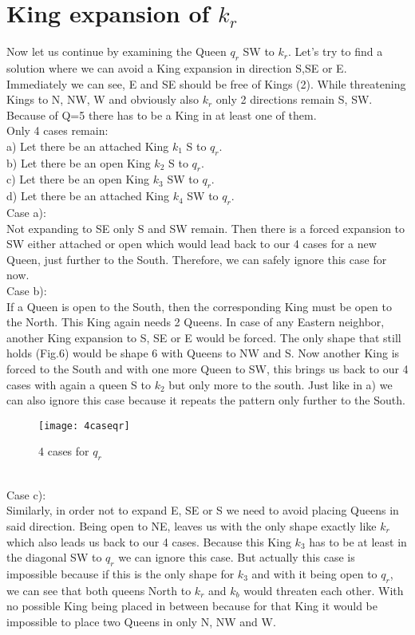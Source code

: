 \documentclass[a4paper,oneside]{scrarticle}
\begin{document}
	\section{King expansion of $k_r$}
	Now let us continue by examining the Queen $q_r$ SW to $k_r$. Let's try to find a solution where we can avoid a King expansion in direction S,SE or E. Immediately we can see, E and SE should be free of Kings (2). While threatening Kings to N, NW, W and obviously also $k_r$ only 2 directions remain S, SW. Because of Q=5 there has to be a King in at least one of them.
	\\
	Only 4 cases remain: 
	\\
	a) Let there be an attached King $k_1$ S to $q_r$.
	\\
	b) Let there be an open King $k_2$ S to $q_r$.
	\\
	c) Let there be an open King $k_3$ SW to $q_r$.
	\\
	d) Let there be an attached King $k_4$ SW to $q_r$.
	\\
	Case a):\\
	Not expanding to SE only S and SW remain. 
	Then there is a forced expansion to SW either attached or open which would lead back to our 4 cases for a new Queen, just further to the South. Therefore, we can safely ignore this case for now.
	\\
	Case b):\\
	If a Queen is open to the South, then the corresponding King must be open to the North. This King again needs 2 Queens. In case of any Eastern neighbor, another King expansion to S, SE or E would be forced.
	The only shape that still holds (Fig.6) would be shape 6 with Queens to NW and S. Now another King is forced to the South and with one more Queen to SW, this brings us back to our 4 cases with again a queen S to $k_2$ but only more to the south. Just like in a) we can also ignore this case because it repeats the pattern only further to the South.
	\\
	\begin{figure}[h]
		\centering
		\texttt{[image: 4caseqr]}
		\caption{4 cases for $q_r$}
		\label{fig:4caseqr}
	\end{figure}
	\\
	Case c):\\
	Similarly, in order not to expand E, SE or S we need to avoid placing Queens in said direction. Being open to NE, leaves us with the only shape exactly like $k_r$ which also leads us back to our 4 cases. Because this King $k_3$ has to be at least in the diagonal SW to $q_r$ we can ignore this case. But actually this case is impossible because if this is the only shape for $k_3$ and with it being open to $q_r$, we can see that both queens North to $k_r$ and $k_b$ would threaten each other. With no possible King being placed in between because for that King it would be impossible to place two Queens in only N, NW and W.
\end{document}
